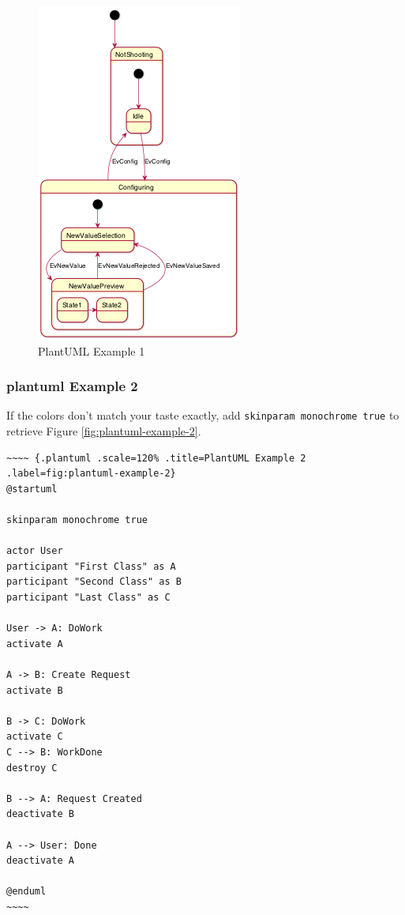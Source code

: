 \documentclass[]{article}
\begin{document}
\normalsize

\begin{figure}[htbp]
\centering
\includegraphics{tmp/ppp-render-_6_eB/image-9.png}
\caption{PlantUML Example 1\label{fig:plantuml-example-1}}
\end{figure}

\newpage

\subsubsection{plantuml Example 2}\label{plantuml-example-2}

If the colors don't match your taste exactly, add
\texttt{skinparam monochrome true} to retrieve Figure
\ref{fig:plantuml-example-2}.

\scriptsize

\begin{verbatim}
~~~~ {.plantuml .scale=120% .title=PlantUML Example 2 .label=fig:plantuml-example-2}
@startuml

skinparam monochrome true

actor User
participant "First Class" as A
participant "Second Class" as B
participant "Last Class" as C

User -> A: DoWork
activate A

A -> B: Create Request
activate B

B -> C: DoWork
activate C
C --> B: WorkDone
destroy C

B --> A: Request Created
deactivate B

A --> User: Done
deactivate A

@enduml
~~~~
\end{verbatim}
\end{document}
